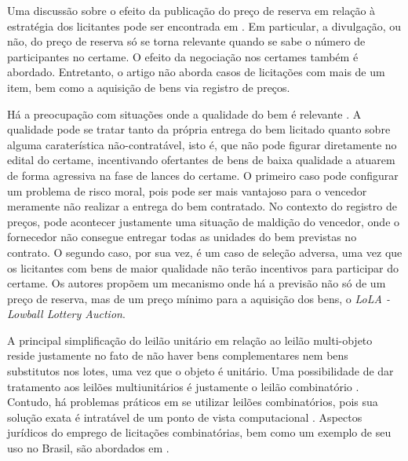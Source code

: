 Uma discussão sobre o efeito da publicação do preço de reserva em relação à estratégia dos licitantes pode ser encontrada em \citep{Bugarin2022}. Em particular, a divulgação, ou não, do preço de reserva só se torna relevante quando se sabe o número de participantes no certame. O efeito da negociação nos certames também é abordado. Entretanto, o artigo não aborda casos de licitações com mais de um item, bem como a aquisição de bens via registro de preços.

Há a preocupação com situações onde a qualidade do bem é relevante \citep{villa:2022}. A qualidade pode se tratar tanto da própria entrega do bem licitado quanto sobre alguma caraterística não-contratável, isto é, que não pode figurar diretamente no edital do certame, incentivando ofertantes de bens de baixa qualidade a atuarem de forma agressiva na fase de lances do certame. O primeiro caso pode configurar um problema de risco moral, pois pode ser mais vantajoso para o vencedor meramente não realizar a entrega do bem contratado. No contexto do registro de preços, pode acontecer justamente uma situação de maldição do vencedor, onde o fornecedor não consegue entregar todas as unidades do bem previstas no contrato. O segundo caso, por sua vez, é um caso de seleção adversa, uma vez que os licitantes com bens de maior qualidade não terão incentivos para participar do certame. Os autores propõem um mecanismo onde há a previsão não só de um preço de reserva, mas de um preço mínimo para a aquisição dos bens, o \emph{LoLA - Lowball Lottery Auction}.

A principal simplificação do leilão unitário em relação ao leilão multi-objeto reside justamente no fato de não haver bens complementares nem bens substitutos nos lotes, uma vez que o objeto é unitário. Uma possibilidade de dar tratamento aos leilões multiunitários é justamente o leilão combinatório \citep{Shoham2008}. Contudo, há problemas práticos em se utilizar leilões combinatórios, pois sua solução exata é intratável de um ponto de vista computacional \citep{Nisan2007}. Aspectos jurídicos do emprego de licitações combinatórias, bem como um exemplo de seu uso no Brasil, são abordados em \citep{pellegrini2018:MSc}.